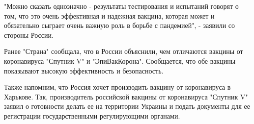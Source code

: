 "Можно сказать однозначно - результаты тестирования и испытаний говорят о том,
что это очень эффективная и надежная вакцина, которая может и обязательно
сыграет очень важную роль в борьбе с пандемией", - заявили со стороны России.

Ранее "Страна" сообщала, что в России объяснили, чем отличаются вакцины от
коронавируса "Спутник V" и "ЭпиВакКорона". Сообщается, что обе вакцины
показывают высокую эффективность и безопасность. 

Также напомним, что Россия хочет производить вакцину от коронавируса в
Харькове. Так, производитель российской вакцины от коронавируса "Спутник V"
заявил о готовности делать ее на территории Украины и подать документы для ее
регистрации государственными регулирующими органами.
